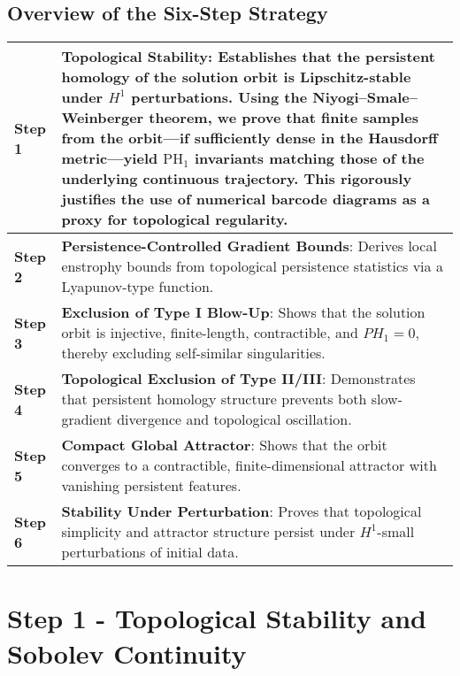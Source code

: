 \documentclass[11pt]{article}
\theoremstyle{definition}
\begin{document}
\subsection*{Overview of the Six-Step Strategy}

\begin{center}
\renewcommand{\arraystretch}{1.3}
\begin{tabular}{|p{1.8cm}|p{12cm}|}
\hline
\textbf{Step 1} & \textbf{Topological Stability}: Establishes that the persistent homology of the solution orbit is Lipschitz-stable under $H^1$ perturbations. Using the Niyogi--Smale--Weinberger theorem, we prove that finite samples from the orbit—if sufficiently dense in the Hausdorff metric—yield $\mathrm{PH}_1$ invariants matching those of the underlying continuous trajectory. This rigorously justifies the use of numerical barcode diagrams as a proxy for topological regularity. \\
\hline
\textbf{Step 2} & \textbf{Persistence-Controlled Gradient Bounds}: Derives local enstrophy bounds from topological persistence statistics via a Lyapunov-type function. \\
\hline
\textbf{Step 3} & \textbf{Exclusion of Type I Blow-Up}: Shows that the solution orbit is injective, finite-length, contractible, and $PH_1 = 0$, thereby excluding self-similar singularities. \\
\hline
\textbf{Step 4} & \textbf{Topological Exclusion of Type II/III}: Demonstrates that persistent homology structure prevents both slow-gradient divergence and topological oscillation. \\
\hline
\textbf{Step 5} & \textbf{Compact Global Attractor}: Shows that the orbit converges to a contractible, finite-dimensional attractor with vanishing persistent features. \\
\hline
\textbf{Step 6} & \textbf{Stability Under Perturbation}: Proves that topological simplicity and attractor structure persist under $H^1$-small perturbations of initial data. \\
\hline
\end{tabular}
\end{center}


\section{Step 1 - Topological Stability and Sobolev Continuity}
\end{document}
